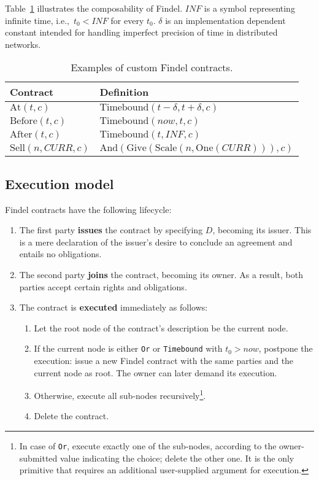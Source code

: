 Table~\ref{tab:Ch10FindelComposability} illustrates the composability of Findel.
$INF$ is a symbol representing infinite time, i.e.,~$t_0 < INF$ for every $t_0$.
$\delta$ is an implementation dependent constant intended for handling imperfect precision of time in distributed networks.

\begin{table}%
	\centering
	\begin{tabular}{|p{0.25\linewidth}|p{0.70\linewidth}|}
		\hline
		\textbf{Contract} & \textbf{Definition} \\
		\hline
		\(\mathrm{At}(t, c)\) & \(\mathrm{Timebound}(t - \delta, t + \delta, c)\) \\
		\hline
		\(\mathrm{Before}(t, c)\) & \(\mathrm{Timebound}(now, t, c)\) \\
		\hline
		\(\mathrm{After}(t, c)\) & \(\mathrm{Timebound}(t, INF, c)\) \\
		\hline
		\(\mathrm{Sell}(n, CURR, c)\) & \(\mathrm{And}(\mathrm{Give}(\mathrm{Scale}(n,\mathrm{One}(CURR))),c)\) \\
		\hline
	\end{tabular}
	\caption{Examples of custom Findel contracts.}
	\label{tab:Ch10FindelComposability}
\end{table}



\subsection{Execution model} \label{sec:Ch10FindelExecutionModel}

Findel contracts have the following lifecycle:

\begin{enumerate}
	\item The first party \textbf{issues} the contract by specifying $D$, becoming its issuer. This is a mere declaration of the issuer's desire to conclude an agreement and entails no obligations.
	\item The second party \textbf{joins} the contract, becoming its owner. As a result, both parties accept certain rights and obligations.
	\item The contract is \textbf{executed} immediately as follows:
	\begin{enumerate}
		\item Let the root node of the contract's description be the current node.
		\item If the current node is either \texttt{Or} or \texttt{Timebound} with $t_0 > now$, postpone the execution: issue a new Findel contract with the same parties and the current node as root. The owner can later demand its execution.
		\item Otherwise, execute all sub-nodes recursively\footnote{In case of \texttt{Or}, execute exactly one of the sub-nodes, according to the owner-submitted value indicating the choice; delete the other one. It is the only primitive that requires an additional user-supplied argument for execution.}.
		\item Delete the contract.
	\end{enumerate}
\end{enumerate}

